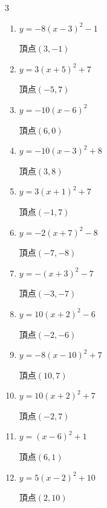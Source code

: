 \begin{multicols}{3}
\begin{enumerate}
  \item $\displaystyle y=-8\left( x-3\right)^{2}-1$

        $\displaystyle 頂点\left( 3 , -1 \right)$

  \item $\displaystyle y=3\left( x+5\right)^{2}+7$

        $\displaystyle 頂点\left( -5 , 7 \right)$

  \item $\displaystyle y=-10\left( x-6\right)^{2}$

        $\displaystyle 頂点\left( 6 , 0 \right)$

  \item $\displaystyle y=-10\left( x-3\right)^{2}+8$

        $\displaystyle 頂点\left( 3 , 8 \right)$

  \item $\displaystyle y=3\left( x+1\right)^{2}+7$

        $\displaystyle 頂点\left( -1 , 7 \right)$

  \item $\displaystyle y=-2\left( x+7\right)^{2}-8$

        $\displaystyle 頂点\left( -7 , -8 \right)$

  \item $\displaystyle y=-\left( x+3\right)^{2}-7$

        $\displaystyle 頂点\left( -3 , -7 \right)$

  \item $\displaystyle y=10\left( x+2\right)^{2}-6$

        $\displaystyle 頂点\left( -2 , -6 \right)$

  \item $\displaystyle y=-8\left( x-10\right)^{2}+7$

        $\displaystyle 頂点\left( 10 , 7 \right)$

  \item $\displaystyle y=10\left( x+2\right)^{2}+7$

        $\displaystyle 頂点\left( -2 , 7 \right)$

  \item $\displaystyle y=\left( x-6\right)^{2}+1$

        $\displaystyle 頂点\left( 6 , 1 \right)$

  \item $\displaystyle y=5\left( x-2\right)^{2}+10$

        $\displaystyle 頂点\left( 2 , 10 \right)$


\end{enumerate}
\end{multicols}
